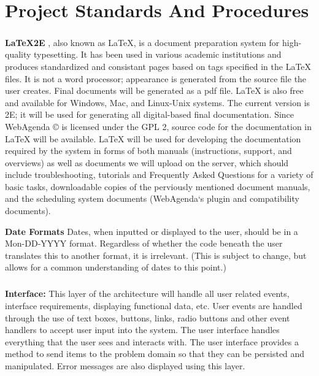 \documentclass[letterpaper,12pt]{report}
\begin{document}
\chapter{Project Standards And Procedures}

\paragraph{}\hspace{0.6cm}\textbf{LaTeX2E} , also known as LaTeX, is a document preparation system for high-quality typesetting. It has been used in various academic institutions and produces standardized and consistant pages based on tags specified in the LaTeX files. It is not a word processor; appearance is generated from the source file the user creates. Final documents will be generated as a pdf file.
LaTeX is also free and available for Windows, Mac, and Linux-Unix systems. The current version is 2E; it will be used for generating all digital-based final documentation. Since WebAgenda © is licensed under the GPL 2, source code for the documentation in LaTeX will be available.
LaTeX will be used for developing the documentation required by the system in forms of both manuals (instructions, support, and overviews) as well as documents we will upload on the server, which should include troubleshooting, tutorials and Frequently Asked Questions for a variety of basic tasks, downloadable copies of the perviously mentioned document manuals, and the scheduling system documents (WebAgenda`s plugin and compatibility documents).

\textbf{Date Formats}  Dates, when inputted or displayed to the user, should be in a Mon-DD-YYYY format. Regardless of whether the code beneath the user translates this to another format, it is irrelevant. (This is subject to change, but allows for a common understanding of dates to this point.)


\paragraph{}\hspace{0.6cm}\textbf{Interface:} This layer of the architecture will handle all user related events, interface requirements, displaying functional data, etc. User events are handled through the use of text boxes, buttons, links, radio buttons and other event handlers to accept user input into the system. The user interface handles everything that the user sees and interacts with. The user interface provides a method to send items to the problem domain so that they can be persisted and manipulated. Error messages are also displayed using this layer.
\pagebreak
\end{document}
